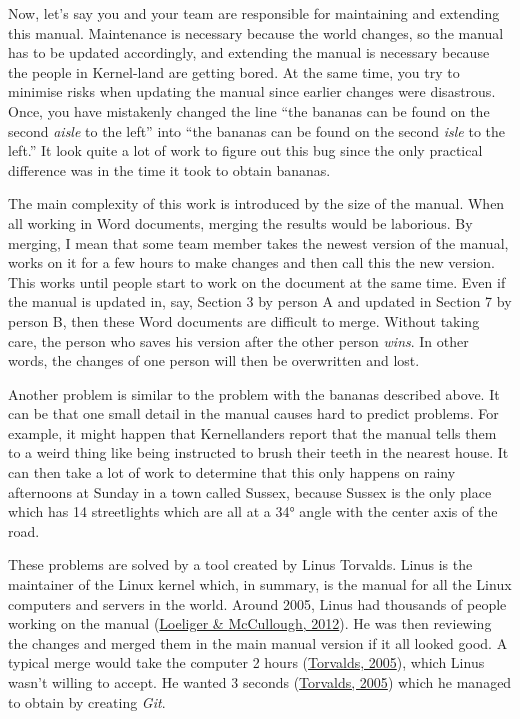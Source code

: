 \documentclass[
  14pt
  american,
  paper=a4,
  ,captions=tableheading
]{scrbook}
\begin{document}
Now, let's say you and your team are responsible for maintaining and
extending this manual. Maintenance is necessary because the world
changes, so the manual has to be updated accordingly, and extending the
manual is necessary because the people in Kernel-land are getting bored.
At the same time, you try to minimise risks when updating the manual
since earlier changes were disastrous. Once, you have mistakenly changed
the line ``the bananas can be found on the second \emph{aisle} to the
left'' into ``the bananas can be found on the second \emph{isle} to the
left.'' It look quite a lot of work to figure out this bug since the
only practical difference was in the time it took to obtain bananas.

The main complexity of this work is introduced by the size of the
manual. When all working in Word documents, merging the results would be
laborious. By merging, I mean that some team member takes the newest
version of the manual, works on it for a few hours to make changes and
then call this the new version. This works until people start to work on
the document at the same time. Even if the manual is updated in, say,
Section 3 by person A and updated in Section 7 by person B, then these
Word documents are difficult to merge. Without taking care, the person
who saves his version after the other person \emph{wins}. In other
words, the changes of one person will then be overwritten and lost.

Another problem is similar to the problem with the bananas described
above. It can be that one small detail in the manual causes hard to
predict problems. For example, it might happen that Kernellanders report
that the manual tells them to a weird thing like being instructed to
brush their teeth in the nearest house. It can then take a lot of work
to determine that this only happens on rainy afternoons at Sunday in a
town called Sussex, because Sussex is the only place which has 14
streetlights which are all at a 34° angle with the center axis of the
road.

These problems are solved by a tool created by Linus Torvalds. Linus is
the maintainer of the Linux kernel which, in summary, is the manual for
all the Linux computers and servers in the world. Around 2005, Linus had
thousands of people working on the manual
(\protect\hyperlink{ref-loeliger2012version}{Loeliger \& McCullough,
2012}). He was then reviewing the changes and merged them in the main
manual version if it all looked good. A typical merge would take the
computer 2 hours (\protect\hyperlink{ref-torvalds2005}{Torvalds, 2005}),
which Linus wasn't willing to accept. He wanted 3 seconds
(\protect\hyperlink{ref-torvalds2005}{Torvalds, 2005}) which he managed
to obtain by creating \emph{Git}.
\end{document}
